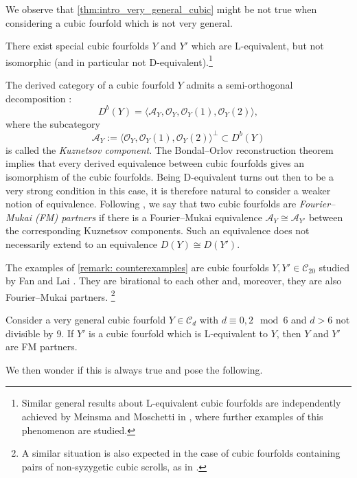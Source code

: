 \documentclass{amsart}
\begin{document}
We observe that \autoref{thm:intro_very_general_cubic} might be not true when considering a cubic fourfold which is not very general. 
\begin{remark}\label{remark: counterexamples}
  There exist special cubic fourfolds \(Y\) and \(Y'\) which are L-equivalent, but not isomorphic (and in particular not D-equivalent).\footnote{Similar general results about L-equivalent cubic fourfolds are independently achieved by Meinsma and Moschetti in \cite{meinsma2026lequivalencefouriermukaipartnerscubic}, where further examples of this phenomenon are studied.}
\end{remark}
The derived category of a cubic fourfold $Y$ admits a semi-orthogonal decomposition \cite{kuznetsov2009derived}:
\[
D^b(Y)=\langle \mathcal{A}_Y, \mathcal{O}_Y, \mathcal{O}_Y(1), \mathcal{O}_Y(2) \rangle,
\]
where the subcategory
\[
\mathcal{A}_Y:=\langle \mathcal{O}_Y, \mathcal{O}_Y(1), \mathcal{O}_Y(2) \rangle^\perp \subset D^b(Y)
\]
is called the \emph{Kuznetsov component}. The Bondal--Orlov reconstruction theorem implies that every derived equivalence between cubic fourfolds gives an isomorphism of the cubic fourfolds. Being D-equivalent turns out then to be a very strong condition in this case, it is therefore natural to consider a weaker notion of equivalence. Following  \cite{huybrechts2017k3}, we say that two cubic fourfolds are \emph{Fourier--Mukai (FM) partners} if there is a Fourier--Mukai equivalence
\(
\mathcal{A}_Y \cong \mathcal{A}_{Y'}
\)
between the corresponding Kuznetsov components. Such an equivalence does not necessarily extend to an equivalence \(D(Y)\cong D(Y')\).

The examples of \autoref{remark: counterexamples} are cubic fourfolds $Y,Y' \in \mathcal{C}_{20}$ studied by Fan and Lai \cite{Fan_Lai:New_rational}. They are birational to each other and, moreover, they are also Fourier--Mukai partners. \footnote{A similar situation is also expected in the case of cubic fourfolds containing pairs of non-syzygetic cubic scrolls, as in \cite{brooke2024birational}.}

\begin{theorem}\label{thm:main_FM_equiv}
    Consider a very general cubic fourfold \(Y\in \mathcal{C}_d\) with \(d\equiv 0,2 \mod 6\) and \(d>6\) not divisible by \(9\). If \(Y'\) is a cubic fourfold which is L-equivalent to \(Y\), then \(Y\) and \(Y'\) are FM partners.
\end{theorem}

We then wonder if this is always true and pose the following. 
\end{document}
